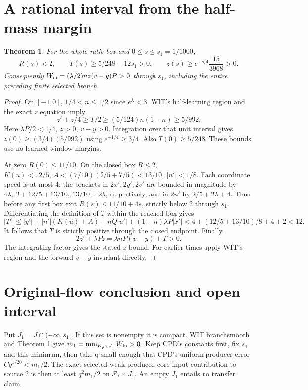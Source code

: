 \documentclass[11pt]{article}
\newtheorem{theorem}{Theorem}\newtheorem{lemma}{Lemma}
\begin{document}
\section{A rational interval from the half-mass margin}\label{an01phsv1:local}
\begin{theorem}\label{an01phsv1:theorem}
For the whole ratio box and \(0\le s\le s_1=1/1000\),
\[
 R(s)<2,\qquad T(s)\ge5/248-12s_1>0,\qquad
 z(s)\ge e^{-s/4}\frac{15}{3968}>0 .
\]
Consequently \(W_{\rm in}=(\lambda/2)n z(v-y)P>0\) through \(s_1\),
including the entire preceding finite selected branch.
\end{theorem}
\begin{proof}
On \([-1,0]\), \(1/4<n\le1/2\) since \(e^\lambda<3\).
WIT's half-learning region and the exact \(z\) equation imply
\[
 z'+z/4\ge T/2\ge(5/124)n(1-n)\ge5/992 .
\]
Here \(\lambda P/2<1/4,\ z>0,\ v-y>0\).
Integration over that unit interval gives \(z(0)\ge(3/4)(5/992)\)
using \(e^{-1/4}\ge3/4\). Also \(T(0)\ge5/248\).
These bounds use no learned-window margins.

At zero \(R(0)\le11/10\). On the closed box \(R\le2\),
\(K(u)<12/5,\ A< (7/10)(2/5+7/5)<13/10,\ |n'|<1/8\).
Each coordinate speed is at most 4: the brackets in \(2x',2y',2v'\)
are bounded in magnitude by \(4\lambda,\ 2+12/5+13/10,\ 13/10+2\lambda\),
respectively, and in \(2u'\) by \(2/5+2\lambda+4\).
Thus before any first box exit \(R(s)\le11/10+4s\), strictly
below 2 through \(s_1\). Differentiating the definition of \(T\)
within the reached box gives
\[
 |T'|\le |y'|+|n'|(K(u)+A)+nQ|u'|+(1-n)\lambda P|x'|
 <4+(12/5+13/10)/8+4+2<12 .
\]
It follows that \(T\) is strictly positive through the closed endpoint.
Finally
\[
 2z'+\lambda Pz=\lambda nP(v-y)+T>0 .
\]
The integrating factor gives the stated \(z\) bound. For earlier times
apply WIT's region and the forward \(v-y\) invariant directly.
\end{proof}

\section{Original-flow conclusion and open interval}\label{an01phsv1:transfer}
Put \(J_1=J\cap(-\infty,s_1]\). If this set is nonempty it is compact.
WIT branchsmooth and Theorem \ref{an01phsv1:theorem} give
\(m_1=\min_{K_\rho\times J_1}W_{\rm in}>0\).
Keep CPD's constants first, fix \(s_1\) and this minimum, then take
q small enough that CPD's uniform producer error \(Cq^{1/20}<m_1/2\).
The exact selected-weak-produced core input contribution to source 2
is then at least \(q^2m_1/2\) on \(\mathcal P_*\times J_1\).
An empty \(J_1\) entails no transfer claim.
\end{document}
